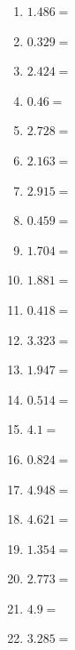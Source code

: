 \documentclass[12pt]{article}
\begin{document}
\begin{enumerate}
\newpage
\item \large $ 1.486 = $ \vspace{1.5cm}
\item \large $ 0.329 = $ \vspace{1.5cm}
\item \large $ 2.424 = $ \vspace{1.5cm}
\item \large $ 0.46 = $ \vspace{1.5cm}
\item \large $ 2.728 = $ \vspace{1.5cm}
\item \large $ 2.163 = $ \vspace{1.5cm}
\item \large $ 2.915 = $ \vspace{1.5cm}
\item \large $ 0.459 = $ \vspace{1.5cm}
\item \large $ 1.704 = $ \vspace{1.5cm}
\item \large $ 1.881 = $ \vspace{1.5cm}
\newpage
\item \large $ 0.418 = $ \vspace{1.5cm}
\item \large $ 3.323 = $ \vspace{1.5cm}
\item \large $ 1.947 = $ \vspace{1.5cm}
\item \large $ 0.514 = $ \vspace{1.5cm}
\item \large $ 4.1 = $ \vspace{1.5cm}
\item \large $ 0.824 = $ \vspace{1.5cm}
\item \large $ 4.948 = $ \vspace{1.5cm}
\item \large $ 4.621 = $ \vspace{1.5cm}
\item \large $ 1.354 = $ \vspace{1.5cm}
\item \large $ 2.773 = $ \vspace{1.5cm}
\newpage
\item \large $ 4.9 = $ \vspace{1.5cm}
\item \large $ 3.285 = $ \vspace{1.5cm}

\end{enumerate}
\end{document}
